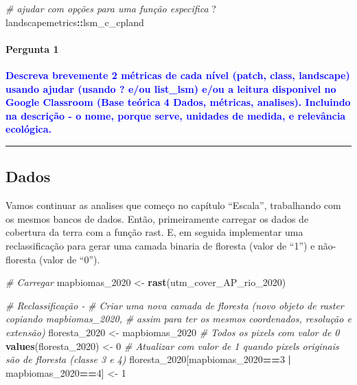 \documentclass[
]{article}
\newenvironment{Shaded}{\begin{snugshade}}{\end{snugshade}}
\newcommand{\CommentTok}[1]{\textcolor[rgb]{0.56,0.35,0.01}{\textit{#1}}}
\newcommand{\DecValTok}[1]{\textcolor[rgb]{0.00,0.00,0.81}{#1}}
\newcommand{\FunctionTok}[1]{\textcolor[rgb]{0.13,0.29,0.53}{\textbf{#1}}}
\newcommand{\NormalTok}[1]{#1}
\newcommand{\OtherTok}[1]{\textcolor[rgb]{0.56,0.35,0.01}{#1}}
\newcommand{\SpecialCharTok}[1]{\textcolor[rgb]{0.81,0.36,0.00}{\textbf{#1}}}
\begin{document}
\begin{Shaded}
\begin{Highlighting}[]
\CommentTok{\# ajudar com opções para uma função especifica}
\NormalTok{?landscapemetrics}\SpecialCharTok{::}\NormalTok{lsm\_c\_cpland}
\end{Highlighting}
\end{Shaded}

\hypertarget{pergunta-1-1}{%
\paragraph{Pergunta 1}\label{pergunta-1-1}}

\textcolor{blue}{\textbf{Descreva brevemente 2 métricas de cada nível (patch, class, landscape) usando ajudar (usando ? e/ou list\_lsm) e/ou a leitura disponivel no Google Classroom (Base teórica 4 Dados, métricas, analises). Incluindo na descrição - o nome, porque serve, unidades de medida, e relevância ecológica.}}

\begin{center}\rule{0.5\linewidth}{0.5pt}\end{center}

\newpage

\hypertarget{dados-1}{%
\subsection{Dados}\label{dados-1}}

Vamos continuar as analises que começo no capítulo ``Escala'', trabalhando com os mesmos bancos de dados.
Então, primeiramente carregar os dados de cobertura da terra com a função rast. E, em seguida implementar uma reclassificação para gerar uma camada binaria de floresta (valor de ``1'') e não-floresta (valor de ``0'').

\begin{Shaded}
\begin{Highlighting}[]
\CommentTok{\# Carregar}
\NormalTok{mapbiomas\_2020 }\OtherTok{\textless{}{-}} \FunctionTok{rast}\NormalTok{(utm\_cover\_AP\_rio\_2020)}

\CommentTok{\# Reclassificação {-} }
\CommentTok{\# Criar uma nova camada de floresta (novo objeto de raster copiando mapbiomas\_2020, }
\CommentTok{\# assim para ter os mesmos coordenados, resolução e extensão)}
\NormalTok{floresta\_2020 }\OtherTok{\textless{}{-}}\NormalTok{ mapbiomas\_2020}
\CommentTok{\# Todos os pixels com valor de 0}
\FunctionTok{values}\NormalTok{(floresta\_2020) }\OtherTok{\textless{}{-}} \DecValTok{0}
\CommentTok{\# Atualizar com valor de 1 quando pixels originais são de floresta (classe 3 e 4)}
\NormalTok{floresta\_2020[mapbiomas\_2020}\SpecialCharTok{==}\DecValTok{3} \SpecialCharTok{|}\NormalTok{ mapbiomas\_2020}\SpecialCharTok{==}\DecValTok{4}\NormalTok{] }\OtherTok{\textless{}{-}} \DecValTok{1} 
\end{Highlighting}
\end{Shaded}
\end{document}
